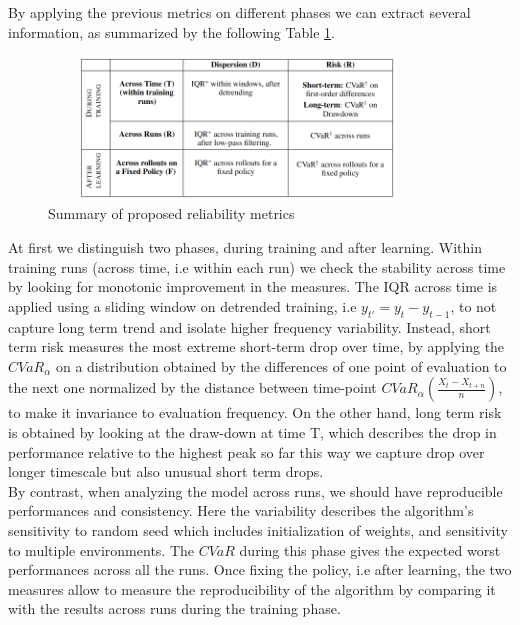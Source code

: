 \documentclass{article}
\begin{document}
By applying the previous metrics on different phases we can extract several information, as summarized by the following Table \ref{fig:table}.
\begin{figure}[!t]
	\centering
	\includegraphics[width=10cm, height=3.8cm]{./images/table.png}
	\caption{Summary of proposed reliability metrics~\cite{GoogleMeasure}}
	\label{fig:table}
	\footnotesize{}
\end{figure}
At first we distinguish two phases, during training and after learning.
Within training runs (across time, i.e within each run) we check the stability across time by looking for monotonic improvement in the measures.
The IQR across time is applied using a sliding window on detrended training, i.e $y_{t'} = y_{t} - y_{t-1}$, to not capture long term trend and isolate higher frequency variability.
Instead, short term risk measures the most extreme short-term drop over time, by applying the $CVaR_\alpha$ on a distribution obtained by the differences of one point of evaluation to the next one normalized by the distance between time-point $CVaR_\alpha \left(\frac{X_t - X_{t+n}}{n}\right)$, to make it invariance to evaluation frequency. On the other hand, long term risk is obtained by looking at the draw-down at time T, which describes the drop in performance relative to the highest peak so far this way we capture drop over longer timescale but also unusual short term drops.\\
By contrast, when analyzing the model across runs, we should have reproducible performances and consistency. Here the variability describes the algorithm’s sensitivity to random seed which includes initialization of weights, and sensitivity to multiple environments. The $CVaR$ during this phase gives the expected worst performances across all the runs.
Once fixing the policy, i.e after learning, the two measures allow to measure the reproducibility of the algorithm by comparing it with the results across runs during the training phase.
\end{document}

